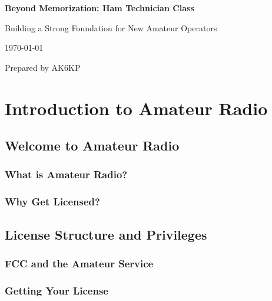 \documentclass[12pt]{book}
\begin{document}
\begin{titlepage}
    \centering
    \vspace*{2cm}    
    {\Huge\bfseries Beyond Memorization: Ham Technician Class\par}
    \vspace{2cm}    
    {\Large Building a Strong Foundation for New Amateur Operators\par}
    
    \vspace{3cm}
    
    {\large\today\par}
    
    \vfill
    
    {\large Prepared by AK6KP\par}
\end{titlepage}

\cleardoublepage

\tableofcontents
\newpage
\part{Introduction to Amateur Radio}
\chapter{Welcome to Amateur Radio}
\section{What is Amateur Radio?}


\section{Why Get Licensed?}

\chapter{License Structure and Privileges}
\section{FCC and the Amateur Service}

\section{Getting Your License}




\end{document}
